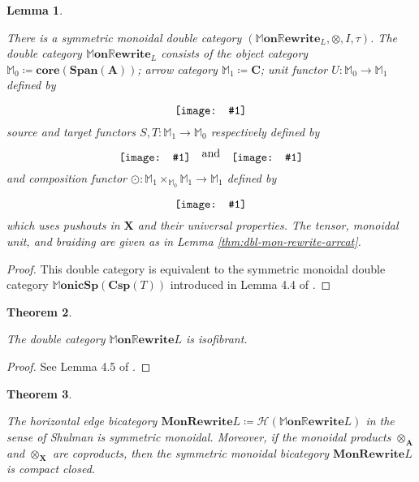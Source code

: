 \documentclass{amsart}
\newcommand{\MM}{\mathbb{M}}
\newcommand{\A}{\cat{A}}
\newcommand{\C}{\cat{C}}
\newcommand{\X}{\cat{X}}
\newcommand{\core}{\mathbf{core}}
\newcommand{\cat}[1]{\mathbf{#1}}
\newcommand{\from}{\colon}
\newcommand{\diagram}[1]{\raisebox{-0.5\height}{\texttt{[image: \#1]}}}
\newcommand{\Span}{\mathbf{Span}}
\newcommand{\MMonSpCsp}[1]{\mathbb{M}\mathbf{onicSp}(\mathbf{Csp}(#1))}
\newcommand{\MonRewrite}{ \mathbf{MonRewrite}}
\newcommand{\MMonRewrite}{ \mathbb{M}\mathbf{on}\mathbb{R}\mathbf{ewrite} }
\newtheorem{theorem}{Theorem}[section]
\newtheorem{lemma}[theorem]{Lemma}
\theoremstyle{remark}
\theoremstyle{definition}
\begin{document}
\begin{lemma}
  \label{thm:dbl-mon-rewr-smc} 

  There is a symmetric monoidal double category
  $ (\MMonRewrite_{L} , \otimes , I , \tau) $. The double category
  $ \MMonRewrite_{L} $ consists of the object category
  $ \MM_0 \coloneqq \core (\Span (\A)) $; arrow category
  $ \MM_1 \coloneqq \C $; unit functor $ U \from \MM_0 \to \MM_1 $
  defined by
  \[
    \diagram{diag_lr_dbl-mon-rewrite-unit-functor}
  \]
  source and target functors $ S , T \from \MM_1 \to \MM_0 $
  respectively defined by
  \[
    \diagram{diag_lr_dbl-mon-rewrite-source-functor}
    \quad \text{and} \quad
    \diagram{diag_lr_dbl-mon-rewrite-target-functor}
  \]
  and composition functor
  $ \odot \from \MM_1 \times_{\MM_0} \MM_1 \to \MM_1 $ defined
  by
  \[
    \diagram{diag_lr_dbl-mon-rewrite-composition-functor}
  \]
  which uses pushouts in $ \X $ and their universal properties.
  The tensor, monoidal unit, and braiding are given as in Lemma
  \ref{thm:dbl-mon-rewrite-arrcat}.
\end{lemma}

\begin{proof}

  This double category is equivalent to the symmetric monoidal double
  category $\MMonSpCsp{T}$ introduced in Lemma 4.4 of
  \cite{sp-csp-top}.
  
\end{proof}

\begin{theorem} \label{thm:dbl-mon-rewrite_isofibrant}
	
  The double category $ \MMonRewrite{L} $ is isofibrant.
  
\end{theorem}

\begin{proof}
	
  See Lemma 4.5 of \cite{sp-csp-top}.
  
\end{proof}

\begin{theorem}
  \label{thm:bi-mon-rewrite-scmm}

  The horizontal edge bicategory
  $ \MonRewrite{L} \coloneqq \mathcal{H} \left( \MMonRewrite{L}
  \right) $ in the sense of Shulman is symmetric monoidal.  Moreover,
  if the monoidal products $ \otimes_{\A} $ and $ \otimes_{\X} $ are
  coproducts, then the symmetric monoidal bicategory
  $ \MonRewrite{L} $ is compact closed.
  
\end{theorem}
\end{document}
